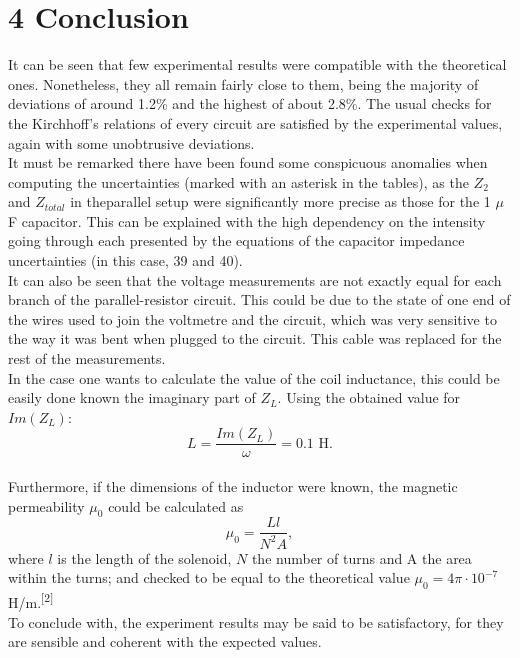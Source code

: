 \documentclass[a4paper, 12pt]{article}
\begin{document}
\section{4 Conclusion}
It can be seen that few experimental results were compatible with the theoretical ones. Nonetheless, they all remain fairly close to them, being the majority of deviations of around 1.2\% and the highest of about 2.8\%. The usual checks for the Kirchhoff's relations of every circuit are satisfied by the experimental values, again with some unobtrusive deviations.\\

It must be remarked there have been found some conspicuous anomalies when computing the uncertainties (marked with an asterisk in the tables), as the $Z_2$ and $Z_{total}$ in theparallel setup were significantly more precise as those for the 1 $\mu$F capacitor. This can be explained with the high dependency on the intensity going through each presented by the equations of the capacitor impedance uncertainties (in this case, 39 and 40). \\

It can also be seen that the voltage measurements are not exactly equal for each branch of the parallel-resistor circuit. This could be due to the state of one end of the wires used to join the voltmetre and the circuit, which was very sensitive to the way it was bent when plugged to the circuit. This cable was replaced for the rest of the measurements.\\

In the case one wants to calculate the value of the coil inductance, this could be easily done known the imaginary part of $Z_L$. Using the obtained value for $Im(Z_L)$:
\begin{equation*}
	L = \frac{Im(Z_L)}{\omega} = 0.1 \mbox{ H.}
\end{equation*}\\

Furthermore, if the dimensions of the inductor were known, the magnetic permeability $\mu_0$ could be calculated as
\begin{equation}\label{mu0}
	\mu_0 = \frac{Ll}{N^2 A},
\end{equation}
where $l$ is the length of the solenoid, $N$ the number of turns and A the area within the turns; and checked to be equal to the theoretical value $\mu_0 = 4\pi \cdot 10^{-7}$ H/m.\textsuperscript{[2]}\\

To conclude with, the experiment results may be said to be satisfactory, for they are sensible and coherent with the expected values.
\end{document}
